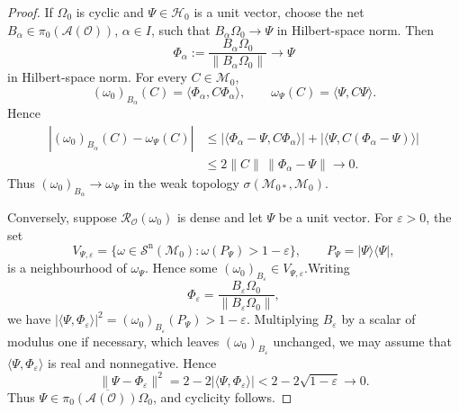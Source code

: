 \documentclass[10pt,a4paper]{amsart}
\newcommand{\A}{\mathcal{A}}
\newcommand{\Sn}{\mathcal{S}^{\mathrm n}}
\begin{document}
\begin{proof}
If $\Omega_0$ is cyclic and $\Psi\in\mathcal H_0$ is a unit vector,
choose the net $B_\alpha\in\pi_0(\A(\mathcal O))$, $\alpha\in I$, such that
$
B_\alpha\Omega_0\longrightarrow\Psi
$
in Hilbert-space norm. Then
\[
\Phi_\alpha
:=
\frac{B_\alpha\Omega_0}{\|B_\alpha\Omega_0\|}
\longrightarrow\Psi
\]
in Hilbert-space norm. For every $C\in\mathcal M_0$,
\[
(\omega_0)_{B_\alpha}(C)
=
\langle\Phi_\alpha,C\Phi_\alpha\rangle,
\qquad
\omega_\Psi(C)
=
\langle\Psi,C\Psi\rangle.
\]
Hence
\[
\begin{aligned}
\left|
(\omega_0)_{B_\alpha}(C)-\omega_\Psi(C)
\right|
&\leq
\left|
\langle\Phi_\alpha-\Psi,C\Phi_\alpha\rangle
\right|
+
\left|
\langle\Psi,C(\Phi_\alpha-\Psi)\rangle
\right|\\
&\leq
2\|C\|\,\|\Phi_\alpha-\Psi\|
\longrightarrow0.
\end{aligned}
\]
Thus
$
(\omega_0)_{B_\alpha}
\longrightarrow
\omega_\Psi
$
in the weak topology
$\sigma(\mathcal M_{0*},\mathcal M_0)$.


Conversely, suppose $\mathcal R_{\mathcal O}(\omega_0)$ is dense and let
$\Psi$ be a unit vector. For $\varepsilon>0$, the set
\[
V_{\Psi,\varepsilon}
=
\{\omega\in\Sn(\mathcal M_0):
\omega(P_\Psi)>1-\varepsilon\},
\qquad
P_\Psi=|\Psi\rangle\langle\Psi|,
\]
is a neighbourhood of $\omega_\Psi$. Hence some
$(\omega_0)_{B_\varepsilon}\in V_{\Psi,\varepsilon}$.Writing
\[
\Phi_\varepsilon
=
\frac{B_\varepsilon\Omega_0}
{\|B_\varepsilon\Omega_0\|},
\]
we have
$
|\langle\Psi,\Phi_\varepsilon\rangle|^2
=
(\omega_0)_{B_\varepsilon}(P_\Psi)
>
1-\varepsilon.
$
Multiplying $B_\varepsilon$ by a scalar of modulus one if necessary,
which leaves $(\omega_0)_{B_\varepsilon}$ unchanged, we may assume that
$\langle\Psi,\Phi_\varepsilon\rangle$ is real and nonnegative. Hence
\[
\|\Psi-\Phi_\varepsilon\|^2
=
2-2|\langle\Psi,\Phi_\varepsilon\rangle|
<
2-2\sqrt{1-\varepsilon}
\longrightarrow0.
\]
Thus
$\Psi\in\overline{\pi_0(\A(\mathcal O))\Omega_0}$, and cyclicity follows.\end{proof}
\end{document}
